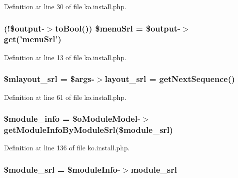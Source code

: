 Definition at line 30 of file ko.\+install.\+php.

\hypertarget{ko_8install_8php_abb9a711d32f19d7aff02c8501ad6fb55}{
\subsubsection[{\$menu\+Srl}]{ (!\$output-\/$>$to\+Bool()) \$menu\+Srl = \$output-\/$>$get('menu\+Srl')}}\label{ko_8install_8php_abb9a711d32f19d7aff02c8501ad6fb55}


Definition at line 13 of file ko.\+install.\+php.

\hypertarget{ko_8install_8php_a576210f0eec2e42df2c40e04a3972bb0}{
\subsubsection[{\$mlayout\+\_\+srl}]{\setlength{\rightskip}{0pt plus 5cm}\${\bf mlayout\+\_\+srl} = \$args-\/$>${\bf layout\+\_\+srl} = {\bf get\+Next\+Sequence}()}}\label{ko_8install_8php_a576210f0eec2e42df2c40e04a3972bb0}


Definition at line 61 of file ko.\+install.\+php.

\hypertarget{ko_8install_8php_a5e701819149f6ea0893d4b79010417d3}{
\subsubsection[{\$module\+\_\+info}]{\setlength{\rightskip}{0pt plus 5cm}\$module\+\_\+info = \$o\+Module\+Model-\/$>$get\+Module\+Info\+By\+Module\+Srl(\${\bf module\+\_\+srl})}}\label{ko_8install_8php_a5e701819149f6ea0893d4b79010417d3}


Definition at line 136 of file ko.\+install.\+php.

\hypertarget{ko_8install_8php_ae40aed4d7a99050245e66ca2a82949ed}{
\subsubsection[{\$module\+\_\+srl}]{\setlength{\rightskip}{0pt plus 5cm}\${\bf module\+\_\+srl} = \$module\+Info-\/$>${\bf module\+\_\+srl}}}\label{ko_8install_8php_ae40aed4d7a99050245e66ca2a82949ed}



